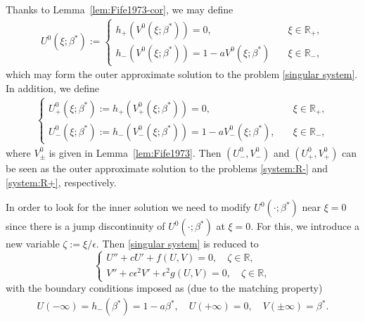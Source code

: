 \documentclass[11pt,a4paper]{article}
\numberwithin{equation}{section}
\numberwithin{figure}{section}
\newcommand\bea{\begin{eqnarray}}
\newcommand\eea{\end{eqnarray}}
\newcommand\beaa{\begin{eqnarray*}}
\newcommand\eeaa{\end{eqnarray*}}
\begin{document}
Thanks to Lemma~\ref{lem:Fife1973-cor}, we may define
\bea\label{U0}
U^0(\xi;\beta^*):=
\begin{cases}
h_+(V^0(\xi;\beta^*))=0,&\quad \xi\in \mathbb{R}_+,\\
h_-(V^0(\xi;\beta^*))=1-aV^0(\xi;\beta^*)&\quad \xi\in \mathbb{R}_-,
\end{cases}
\eea
which may form the outer approximate solution to the problem \eqref{singular system}.
In addition, we define
\bea\label{outer-U0pm}
\begin{cases}
U^0_{+}(\xi;\beta^*):=h_{+}(V^0_{+}(\xi;\beta^*))=0, &\quad \xi\in\mathbb{R}_{+},\\
U^0_{-}(\xi;\beta^*):=h_{-}(V^0_{-}(\xi;\beta^*))=1-aV^0_{-}(\xi;\beta^*), &\quad \xi\in\mathbb{R}_{-},
\end{cases}
\eea
where $V^0_{\pm}$ is given in Lemma~\ref{lem:Fife1973}.
Then $(U^0_{-},V^0_{-})$ and $(U^0_{+},V^0_{+})$
can be seen as
the outer approximate solution to the problems \eqref{system:R-} and \eqref{system:R+}, respectively.


In order to look for the inner solution we need to modify $U^0(\cdot; \beta^*)$ near $\xi=0$ since there is a jump discontinuity of $U^0(\cdot;\beta^*)$ at $\xi=0$.
For this, we introduce a new variable $\zeta:=\xi/\epsilon$. Then \eqref{singular system} is reduced to
\begin{equation}\label{system-zeta}
\begin{cases}
U''+cU'+f(U,V)=0,\quad \zeta\in\mathbb{R},\\
V''+c\epsilon^2 V'+\epsilon^2 g(U,V)=0,\quad \zeta\in\mathbb{R},
\end{cases}
\end{equation}
with the boundary conditions imposed as (due to the matching property)
\beaa
U(-\infty)=h_-(\beta^*)=1-a\beta^*,\quad U(+\infty)=0,\quad V(\pm\infty)=\beta^*.
\eeaa



\end{document}
